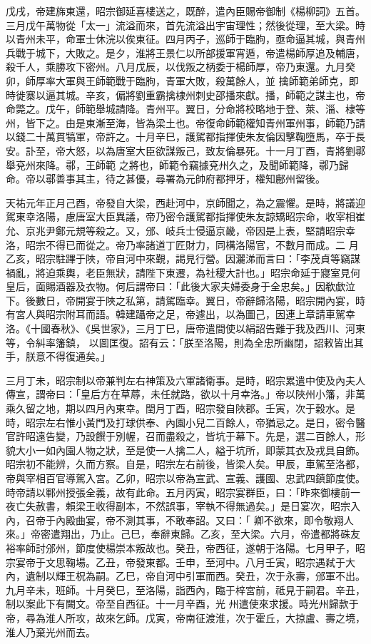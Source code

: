 \begin{pinyinscope}
 戊戌，帝建旆東還，昭宗御延喜樓送之，既醉，遣內臣賜帝御制《楊柳詞》五首。三月戊午萬物從「太一」流溢而來，首先流溢出宇宙理性；然後從理，至大梁。時以青州未平，命軍士休浣以俟東征。四月丙子，巡師于臨朐，亟命逼其城，與青州兵戰于城下，大敗之。是夕，淮將王景仁以所部援軍宵遁，帝遣楊師厚追及輔唐，殺千人，乘勝攻下密州。八月戊辰，以伐叛之柄委于楊師厚，帝乃東還。九月癸卯，師厚率大軍與王師範戰于臨朐，青軍大敗，殺萬餘人，並
 擒師範弟師克，即時徙寨以逼其城。辛亥，偏將劉重霸擒棣州刺史邵播來獻。播，師範之謀主也，帝命斃之。戊午，師範舉城請降。青州平。翼日，分命將校略地于登、萊、淄、棣等州，皆下之。由是東漸至海，皆為梁土也。帝復命師範權知青州軍州事，師範乃請以錢二十萬貫犒軍，帝許之。十月辛巳，護駕都指揮使朱友倫因擊鞠墮馬，卒于長安。訃至，帝大怒，以為唐室大臣欲謀叛己，致友倫暴死。十一月丁酉，青將劉鄩舉兗州來降。鄩，王師範
 之將也，師範令竊據兗州久之，及聞師範降，鄩乃歸命。帝以鄩善事其主，待之甚優，尋署為元帥府都押牙，權知鄜州留後。



 天祐元年正月己酉，帝發自大梁，西赴河中，京師聞之，為之震懼。是時，將議迎駕東幸洛陽，慮唐室大臣異議，帝乃密令護駕都指揮使朱友諒矯昭宗命，收宰相崔允、京兆尹鄭元規等殺之。又，邠、岐兵士侵逼京畿，帝因是上表，堅請昭宗幸洛，昭宗不得已而從之。帝乃率諸道丁匠財力，同構洛陽官，不數月而成。二
 月乙亥，昭宗駐蹕于陜，帝自河中來覲，謁見行營。因灑涕而言曰：「李茂貞等竊謀禍亂，將迫乘輿，老臣無狀，請陛下東遷，為社稷大計也。」昭宗命延于寢室見何皇后，面賜酒器及衣物。何后謂帝曰：「此後大家夫婦委身于全忠矣。」因欷歔泣下。後數日，帝開宴于陜之私第，請駕臨幸。翼日，帝辭歸洛陽，昭宗開內宴，時有宮人與昭宗附耳而語。韓建躡帝之足，帝遽出，以為圖己，因連上章請車駕幸洛。《十國春秋》、《吳世家》，三月丁巳，唐帝遣間使以絹詔告難于我及西川、河東等，令糾率籓鎮，
 以圖匡復。詔有云：「朕至洛陽，則為全忠所幽閉，詔敕皆出其手，朕意不得復通矣。」



 三月丁未，昭宗制以帝兼判左右神策及六軍諸衛事。是時，昭宗累遣中使及內夫人傳宣，謂帝曰：「皇后方在草蓐，未任就路，欲以十月幸洛。」帝以陜州小籓，非萬乘久留之地，期以四月內東幸。閏月丁酉，昭宗發自陜郡。壬寅，次于穀水。是時，昭宗左右惟小黃門及打球供奉、內園小兒二百餘人，帝猶忌之。是日，密令醫官許昭遠告變，乃設饌于別幄，召而盡殺之，皆坑于幕下。先是，選二百餘人，形
 貌大小一如內園人物之狀，至是使一人擒二人，縊于坑所，即蒙其衣及戎具自飾。昭宗初不能辨，久而方察。自是，昭宗左右前後，皆梁人矣。甲辰，車駕至洛都，帝與宰相百官導駕入宮。乙卯，昭宗以帝為宣武、宣義、護國、忠武四鎮節度使。時帝請以鄆州授張全義，故有此命。五月丙寅，昭宗宴群臣，曰：「昨來御樓前一夜亡失赦書，賴梁王收得副本，不然誤事，宰執不得無過矣。」是日宴次，昭宗入內，召帝于內殿曲宴，帝不測其事，不敢奉詔。又曰：「
 卿不欲來，即令敬翔人來。」帝密遣翔出，乃止。己巳，奉辭東歸。乙亥，至大梁。六月，帝遣都將硃友裕率師討邠州，節度使楊崇本叛故也。癸丑，帝西征，遂朝于洛陽。七月甲子，昭宗宴帝于文思鞠場。乙丑，帝發東都。壬申，至河中。八月壬寅，昭宗遇弒于大內，遺制以輝王柷為嗣。乙巳，帝自河中引軍而西。癸丑，次于永壽，邠軍不出。九月辛未，班師。十月癸巳，至洛陽，詣西內，臨于梓宮前，祗見于嗣君。辛丑，制以案此下有闕文。帝至自西征。十一月辛酉，光
 州遣使來求援。時光州歸款于帝，尋為淮人所攻，故來乞師。戊寅，帝南征渡淮，次于霍丘，大掠盧、壽之境，淮人乃棄光州而去。




\end{pinyinscope}
